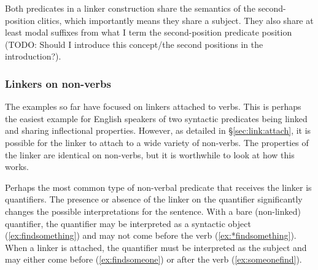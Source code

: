 Both predicates in a linker construction share the semantics of the second-position clitics, which importantly means they share a subject. They also share at least modal suffixes from what I term the second-position predicate position (TODO: Should I introduce this concept/the second positions in the introduction?).


\begin{comment}
\ex \label{ex:someonespoke}
\begingl
\glpreamble ʔuušqḥʔaƛ ciqšiƛ.//
\gla ʔuuš-qḥ=ʔaƛ ciq-šiƛ //
\glb some-\textsc{link}=\textsc{now} speak-\textsc{mo} //
\glft `Someone spoke.' //
\endgl
\xe

\ex~ \label{ex:*someonespoke}
\begingl
\glpreamble *ʔuušqḥʔaƛ ciqšiƛḥ.//
\gla *ʔuuš-(q)ḥ=ʔaƛ ciq-šiƛ-(q)ḥ //
\glb *some-\textsc{link}=\textsc{now} speak-\textsc{mo}-\textsc{link} //
\glft Intended: `Someone spoke.' //
\endgl
\xe
\end{comment}


\subsubsection{Linkers on non-verbs} \label{sec:link:nonverb}

The examples so far have focused on linkers attached to verbs. This is perhaps the easiest example for English speakers of two syntactic predicates being linked and sharing inflectional properties. However, as detailed in \S\ref{sec:link:attach}, it is possible for the linker to attach to a wide variety of non-verbs. The properties of the linker are identical on non-verbs, but it is worthwhile to look at how this works.

Perhaps the most common type of non-verbal predicate that receives the linker is quantifiers. The presence or absence of the linker on the quantifier significantly changes the possible interpretations for the sentence. With a bare (non-linked) quantifier, the quantifier may be interpreted as a syntactic object (\ref{ex:findsomething}) and may not come before the verb (\ref{ex:*findsomething}). When a linker is attached, the quantifier must be interpreted as the subject and may either come before (\ref{ex:findsomeone}) or after the verb (\ref{ex:someonefind}).

